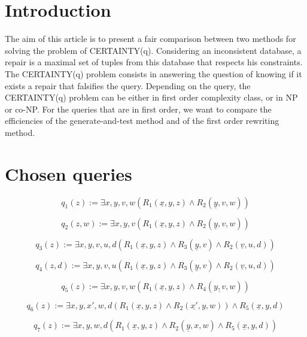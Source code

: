 
\section{Introduction}
The aim of this article is to present a fair comparison between two methods for solving the problem of CERTAINTY(q). Considering an inconsistent database, a repair is a maximal set of tuples from this database that respects his constraints. The CERTAINTY(q) problem consists in answering the question of knowing if it exists a repair that falsifies the query. Depending on the query, the CERTAINTY(q) problem can be either in first order complexity class, or in NP or co-NP. For the queries that are in first order, we want to compare the efficiencies of the generate-and-test method and of the first order rewriting method. 



\section{Chosen queries}

$$q_1(z) := \exists x, y, v, w (R_1(\underline{x},y,z) \wedge R_2(\underline{y}, v, w)) $$

$$q_2(z,w) :=  \exists x, y, v (R_1(\underline{x},y,z) \wedge R_2(\underline{y}, v, w)) $$

$$q_3(z) :=  \exists x, y, v, u, d (R_1(\underline{x},y,z) \wedge R_3(\underline{y}, v) \wedge R_2(\underline{v}, u,d)) $$

$$q_4(z,d) :=  \exists x, y, v, u (R_1(\underline{x},y,z) \wedge R_3(\underline{y}, v)\wedge R_2(\underline{v}, u, d)) $$

$$q_5(z) := \exists x, y, v, w (R_1(\underline{x},y,z) \wedge R_4(\underline{y, v},w)) $$

$$q_6(z) := \exists x, y, x', w, d (R_1(\underline{x},y,z) \wedge R_2(\underline{x'},y,w))
\wedge R_5(\underline{x},y,d) $$

$$q_7(z) := \exists x, y, w, d (R_1(\underline{x},y,z) \wedge R_2(\underline{y},x,w) \wedge R_5(\underline{x},y,d)) $$

